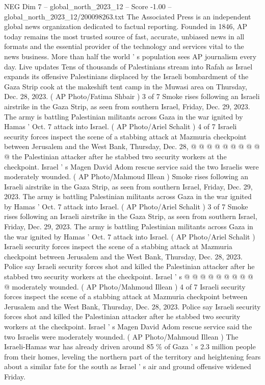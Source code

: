 \begin{textsample}{NEG Dim 7 – global\_north\_2023\_12 – Score -1.00 – global\_north\_2023\_12/200098263.txt}  \label{ex:f7_neg_302}
The Associated Press is an independent global news organization dedicated to factual reporting.
Founded in 1846, AP today remains the most trusted source of fast, accurate, unbiased news in all formats and the essential provider of the technology and services vital to the news business.
More than half the world ' s population sees AP journalism every day.
Live updates Tens of thousands of Palestinians stream into Rafah as Israel expands its offensive Palestinians displaced by the Israeli bombardment of the Gaza Strip cook at the makeshift tent camp in the Muwasi area on Thursday, Dec. 28, 2023. ( AP Photo/Fatima Shbair ) 3 of 7 Smoke rises following an Israeli airstrike in the Gaza Strip, as seen from southern Israel, Friday, Dec. 29, 2023.
The army is battling Palestinian militants across Gaza in the war ignited by Hamas ' Oct. 7 attack into Israel. ( AP Photo/Ariel Schalit ) 4 of 7 Israeli security forces inspect the scene of a stabbing attack at Mazmuria checkpoint between Jerusalem and the West Bank, Thursday, Dec. 28, @ @ @ @ @ @ @ @ @ @ the Palestinian attacker after he stabbed two security workers at the checkpoint.
Israel ' s Magen David Adom rescue service said the two Israelis were moderately wounded. ( AP Photo/Mahmoud Illean ) Smoke rises following an Israeli airstrike in the Gaza Strip, as seen from southern Israel, Friday, Dec. 29, 2023.
The army is battling Palestinian militants across Gaza in the war ignited by Hamas ' Oct. 7 attack into Israel. ( AP Photo/Ariel Schalit ) 3 of 7 Smoke rises following an Israeli airstrike in the Gaza Strip, as seen from southern Israel, Friday, Dec. 29, 2023.
The army is battling Palestinian militants across Gaza in the war ignited by Hamas ' Oct. 7 attack into Israel. ( AP Photo/Ariel Schalit ) Israeli security forces inspect the scene of a stabbing attack at Mazmuria checkpoint between Jerusalem and the West Bank, Thursday, Dec. 28, 2023.
Police say Israeli security forces shot and killed the Palestinian attacker after he stabbed two security workers at the checkpoint.
Israel ' s @ @ @ @ @ @ @ @ @ @ moderately wounded. ( AP Photo/Mahmoud Illean ) 4 of 7 Israeli security forces inspect the scene of a stabbing attack at Mazmuria checkpoint between Jerusalem and the West Bank, Thursday, Dec. 28, 2023.
Police say Israeli security forces shot and killed the Palestinian attacker after he stabbed two security workers at the checkpoint.
Israel ' s Magen David Adom rescue service said the two Israelis were moderately wounded. ( AP Photo/Mahmoud Illean ) The Israeli-Hamas war has already driven around 85 \% of Gaza ' s 2.3 million people from their homes, leveling the northern part of the territory and heightening fears about a similar fate for the south as Israel ' s air and ground offensive widened Friday.

\end{textsample}
